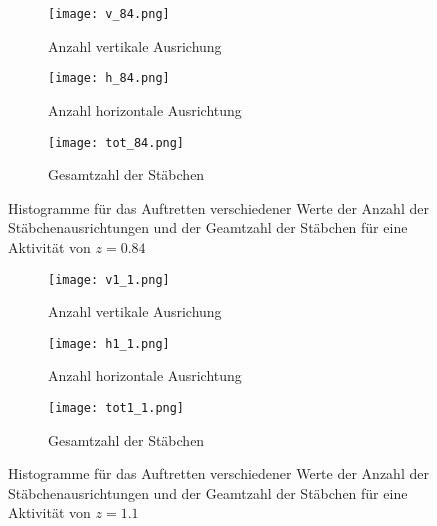 \documentclass[12pt]{article}
\begin{document}
\begin{figure}[H]\hspace*{-1.5cm}
        \begin{subfigure}{0.4\textwidth}
        \texttt{[image: v\_84.png]}
        \caption{Anzahl vertikale Ausrichung\newline
        }
        \end{subfigure}
        \hfill
        \begin{subfigure}{0.4\textwidth}
        \hspace*{-0.8cm}
        \texttt{[image: h\_84.png]}
        \caption{Anzahl horizontale Ausrichtung}
        \end{subfigure}
        \hfill
        \hspace*{-1.5cm}
        \begin{subfigure}{0.4\textwidth}
        \texttt{[image: tot\_84.png]}
        \caption{Gesamtzahl der Stäbchen}
        \end{subfigure}
        \hfill
        \caption{Histogramme für das Auftretten verschiedener Werte der Anzahl der Stäbchenausrichtungen und der Geamtzahl der Stäbchen für eine Aktivität von $z=0.84$}
\end{figure} 

\begin{figure}[H]\hspace*{-1.5cm}
            \begin{subfigure}{0.4\textwidth}
            \texttt{[image: v1\_1.png]}
            \caption{Anzahl vertikale Ausrichung\newline
            }
            \end{subfigure}
            \hfill
            \begin{subfigure}{0.4\textwidth}
            \hspace*{-0.8cm}
            \texttt{[image: h1\_1.png]}
            \caption{Anzahl horizontale Ausrichtung}
            \end{subfigure}
            \hfill
            \hspace*{-1.5cm}
            \begin{subfigure}{0.4\textwidth}
            \texttt{[image: tot1\_1.png]}
            \caption{Gesamtzahl der Stäbchen}
            \end{subfigure}
            \hfill
            \caption{Histogramme für das Auftretten verschiedener Werte der Anzahl der Stäbchenausrichtungen und der Geamtzahl der Stäbchen für eine Aktivität von $z=1.1$}
\end{figure}
\end{document}
